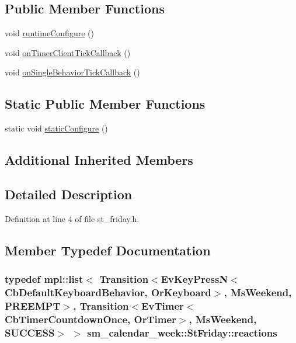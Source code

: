 \subsection*{Public Member Functions}
\begin{DoxyCompactItemize}
\item 
void \hyperlink{structsm__calendar__week_1_1StFriday_a5fce56702b4d55872f82dc77194e9067}{runtime\+Configure} ()
\item 
void \hyperlink{structsm__calendar__week_1_1StFriday_a79317a2a67708590e046d49627a30a55}{on\+Timer\+Client\+Tick\+Callback} ()
\item 
void \hyperlink{structsm__calendar__week_1_1StFriday_a3d697235b90c176eb1524cd76c2d628f}{on\+Single\+Behavior\+Tick\+Callback} ()
\end{DoxyCompactItemize}
\subsection*{Static Public Member Functions}
\begin{DoxyCompactItemize}
\item 
static void \hyperlink{structsm__calendar__week_1_1StFriday_a887ff28737ceb01b3540a1295bd75bb0}{static\+Configure} ()
\end{DoxyCompactItemize}
\subsection*{Additional Inherited Members}


\subsection{Detailed Description}


Definition at line 4 of file st\+\_\+friday.\+h.



\subsection{Member Typedef Documentation}
\subsubsection[{\texorpdfstring{reactions}{reactions}}]{\setlength{\rightskip}{0pt plus 5cm}typedef mpl\+::list$<$ Transition$<$Ev\+Key\+PressN$<$Cb\+Default\+Keyboard\+Behavior, {\bf Or\+Keyboard}$>$, {\bf Ms\+Weekend}, {\bf P\+R\+E\+E\+M\+PT}$>$, Transition$<$Ev\+Timer$<$Cb\+Timer\+Countdown\+Once, {\bf Or\+Timer}$>$, {\bf Ms\+Weekend}, {\bf S\+U\+C\+C\+E\+SS}$>$ $>$ {\bf sm\+\_\+calendar\+\_\+week\+::\+St\+Friday\+::reactions}}\hypertarget{structsm__calendar__week_1_1StFriday_a3086092f43c6f0426130aa46b55edaab}{}\label{structsm__calendar__week_1_1StFriday_a3086092f43c6f0426130aa46b55edaab}


